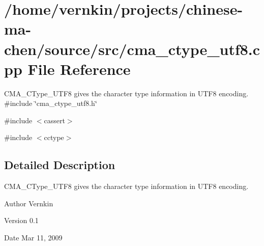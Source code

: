 \section{/home/vernkin/projects/chinese-\/ma-\/chen/source/src/cma\_\-ctype\_\-utf8.cpp File Reference}
\label{cma__ctype__utf8_8cpp}


CMA\_\-CType\_\-UTF8 gives the character type information in UTF8 encoding.  
{\ttfamily \#include \char`\"{}cma\_\-ctype\_\-utf8.h\char`\"{}}\par
{\ttfamily \#include $<$cassert$>$}\par
{\ttfamily \#include $<$cctype$>$}\par


\subsection{Detailed Description}
CMA\_\-CType\_\-UTF8 gives the character type information in UTF8 encoding. \begin{DoxyAuthor}{Author}
Vernkin 
\end{DoxyAuthor}
\begin{DoxyVersion}{Version}
0.1 
\end{DoxyVersion}
\begin{DoxyDate}{Date}
Mar 11, 2009 
\end{DoxyDate}
